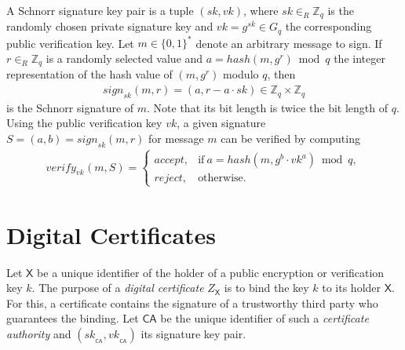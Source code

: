 \documentclass[bibtotoc,halfparskip,oneside]{scrreprt}
\newcommand{\sk}[1]{\mathit{sk}_{#1}\xspace}
\newcommand{\vk}[1]{\mathit{vk}_{#1}\xspace}
\newcommand{\SK}[1]{\sk{_#1}\xspace}
\newcommand{\VK}[1]{\vk{_#1}\xspace}
\newcommand{\CA}{\ensuremath{\mathsf{CA}}\xspace}
\begin{document}
	A Schnorr signature key pair is a tuple $(sk,vk)$, where $sk\in_R\mathbb{Z}_q$ is the randomly chosen private signature key and $vk=g^{sk}\in G_q$ the corresponding public verification key. Let $m\in\{0,1\}^*$ denote an arbitrary message to sign. If $r\in_R\mathbb{Z}_q$ is a randomly selected value and $a=\mathit{hash}(m,g^r) \bmod q$ the integer representation of the hash value of $(m,g^r)$ modulo $q$, then
	\begin{align}
		\mathit{sign}_{sk}(m,r)=(a,r-a\cdot sk)\in \mathbb{Z}_q\times \mathbb{Z}_q
	\end{align}
	is the Schnorr signature of $m$. Note that its bit length is twice the bit length of $q$. Using the public verification key $vk$, a given signature $S=(a,b)=\mathit{sign}_{sk}(m,r)$ for message $m$ can be verified by computing
	\begin{align}
		\mathit{verify}_{\vk{}}(m,S)=\begin{cases}
			\mathit{accept}, & \text{if}~ a = \mathit{hash}(m,g^b\cdot vk^a) \bmod q,\\
			\mathit{reject}, & \text{otherwise}.
		\end{cases}
	\end{align}
	
	\section{Digital Certificates} 
	
	Let $\mathsf{X}$ be a unique identifier of the holder of a public encryption or verification key $k$. The purpose of a \emph{digital certificate} $Z_{\mathsf{X}}$ is to bind the key $k$ to its holder $\mathsf{X}$. For this, a certificate contains the signature of a trustworthy third party who guarantees the binding. Let $\CA$ be the unique identifier of such a \emph{certificate authority} and $(\SK{\CA},\VK{\CA})$ its signature key pair.
	
\end{document}
